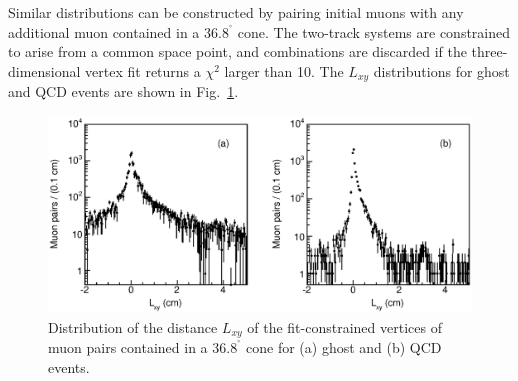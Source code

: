 \documentclass[aps,prd,preprint,floatfix,nofootinbib,superscriptaddress,showpacs,amssymb]{revtex4}
\def\deg{^\circ}
\begin{document}
 Similar distributions can be constructed by pairing initial muons with any
 additional muon contained in a $36.8^{\deg}$ cone. The two-track systems are 
 constrained to arise from a common space point, and combinations are 
 discarded if the three-dimensional vertex fit returns a $\chi^2$  larger
 than 10. The $L_{xy}$ distributions for ghost and QCD events are shown in
 Fig.~\ref{fig:fig_36}.
 \begin{figure}
 \begin{center}
 \vspace{-0.3in}
 \leavevmode
 \includegraphics*[width=\textwidth]{fa0_36.eps}
 \caption[]{Distribution of the distance $L_{xy}$ of the fit-constrained
            vertices of muon pairs contained in a $36.8^{\deg}$ cone for
            (a) ghost and (b) QCD events.} 
 \label{fig:fig_36}
 \end{center}
 \end{figure}
\end{document}
